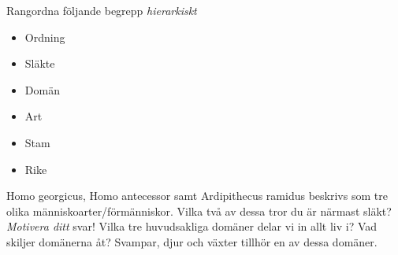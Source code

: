 \documentclass{exam}
\begin{document}
\vspace{5mm} %
\begin{center}
\end{center}
\vspace{5mm} %
\begin{questions}
\question Rangordna följande begrepp \textit{hierarkiskt}

\begin{itemize}
  \item Ordning 
  \item Släkte
  \item Domän
  \item Art
  \item Stam
  \item Rike
\end{itemize}
\vspace{5mm} %
\question
Homo georgicus, Homo antecessor samt Ardipithecus ramidus beskrivs som tre olika människoarter/förmänniskor. Vilka två av dessa tror du är närmast släkt? \textit{Motivera ditt} svar!
\vspace{30mm} 
\question
Vilka tre huvudsakliga domäner delar vi in allt liv i? Vad skiljer domänerna åt?
\vspace{30mm} 
\question
Svampar, djur och växter tillhör en av dessa domäner.
\end{questions}
\end{document}
